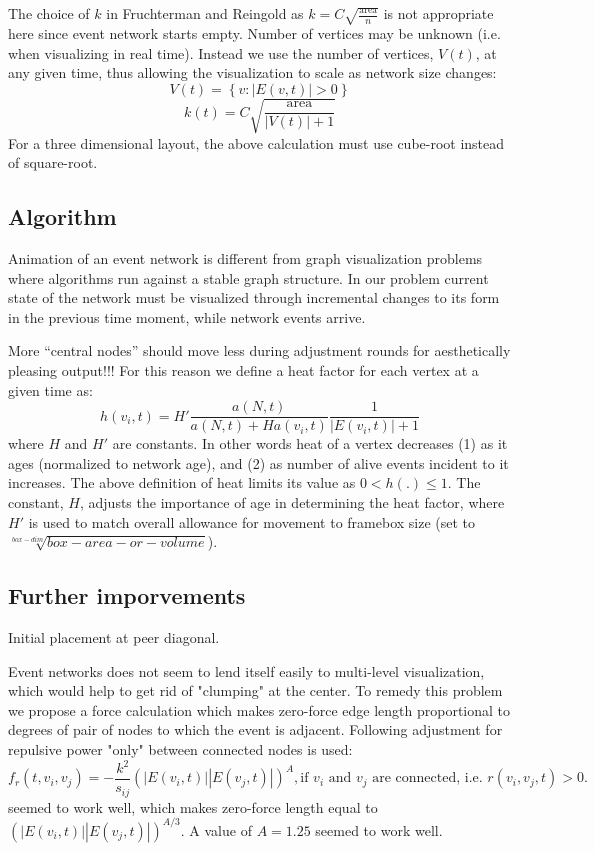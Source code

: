\documentclass{article}
\begin{document}
The choice of $k$ in Fruchterman and Reingold as $k=C\sqrt{\frac{\textrm{area}}{n}}$ is not appropriate here since event network starts empty. Number of vertices may be unknown (i.e. when visualizing in real time). Instead we use the number of vertices, $V(t)$, at any given time, thus allowing the visualization to scale as network size changes:
\[ V(t)=\left\{v: |E(v,t)|>0\right\} \]
\[ k(t)=C\sqrt{\frac{\textrm{area}}{|V(t)|+1}}\]
For a three dimensional layout, the above calculation must use cube-root instead of square-root.

\subsection{Algorithm}
Animation of an event network is different from graph visualization problems where algorithms run against a stable graph structure. In our problem current state of the network must be visualized through incremental changes to its form in the previous time moment, while network events arrive.

More ``central nodes'' should move less during adjustment rounds for aesthetically pleasing output!!! For this reason we define a heat factor for each vertex at a given time as:
\[ h(v_i,t)=H' \frac{a(N,t)}{a(N,t) + H a(v_i,t)} \frac{1}{|E(v_i,t)| + 1} \]
where $H$ and $H'$ are constants. In other words heat of a vertex decreases (1) as it ages (normalized to network age), and (2) as number of alive events incident to it increases. The above definition of heat limits its value as $0<h(.)\le 1$. The constant, $H$, adjusts the importance of age in determining the heat factor, where $H'$ is used to match overall allowance for movement to framebox size (set to $\sqrt[box-dim]{box- area- or- volume}$).

\subsection{Further imporvements}
Initial placement at peer diagonal.

Event networks does not seem to lend itself easily to multi-level visualization, which would help to get rid of "clumping" at the center. To remedy this problem we propose a force calculation which makes zero-force edge length proportional to degrees of pair of nodes to which the event is adjacent. Following adjustment for  repulsive power "only" between connected nodes is used:
\[f_r(t,v_i,v_j)=-\frac{k^2}{s_{ij}} (|E(v_i,t)| |E(v_j,t)|)^A, \textrm{if $v_i$ and $v_j$ are connected, i.e. $r(v_i,v_j,t)>0$.}\]
seemed to work well, which makes zero-force length equal to  $(|E(v_i,t)| |E(v_j,t)|)^{A/3}$. A value of $A=1.25$ seemed to work well.

\end{document}
